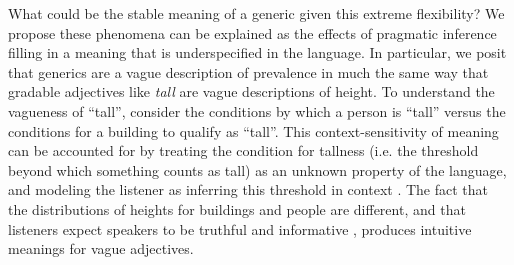 \documentclass[10pt,letterpaper]{article}
\newcommand{\red}[1]{\textcolor{Red}{#1}}
\begin{document}
%
%
%
%

What could be the stable meaning of a generic given this extreme flexibility? 
We propose these phenomena can be explained as the effects of pragmatic inference filling in a meaning that is underspecified in the language. 
%
In particular, we posit that generics are a vague description of prevalence in much the same way that gradable adjectives like \emph{tall} are vague descriptions of height. 
To understand the vagueness of ``tall'', consider the conditions by which a person is ``tall'' versus the conditions for a building to qualify as ``tall''.
This context-sensitivity of meaning can be accounted for by treating the condition for tallness (i.e. the threshold beyond which something counts as tall) as an unknown property of the language, and modeling the listener as inferring this threshold in context \cite{Lassiter2015}. 
The fact that the distributions of heights for buildings and people are different, and that listeners expect speakers to be truthful and informative \cite{Clark1996, Grice1975, Levinson2000}, produces intuitive meanings for vague adjectives.
 
\end{document}

